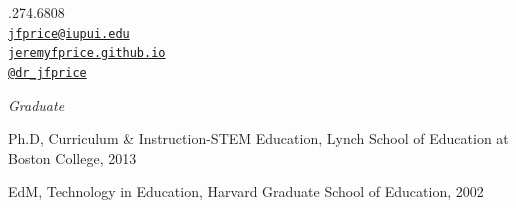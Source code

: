 \documentclass[11pt,article,oneside]{memoir}
\makeatletter
\def\myemail{jfprice@iupui.edu}
\def\myweb{jeremyfprice.github.io}
\def\myphone{1.317.274.6808}
\def\mytwitter{@dr\_jfprice}
\makeatother
\begin{document}


\begin{minipage}[t]{2.95in}
  
\end{minipage}
\hfill     
\hfill
\begin{minipage}[t]{1.3in}
  \flushright \footnotesize  \addressblock \myphone \, \faPhone \\ 
  {\scriptsize  \texttt{\href{mailto:\myemail}{\myemail}} \, \faEnvelope} \\
  {\scriptsize  \texttt{\href{\myweb}{\myweb}} \, \faGlobe} \\
  {\scriptsize  \texttt{\href{http://twitter.com/dr_jfprice}{\mytwitter}} \, \faTwitter } 
\end{minipage}

\medskip

\reversemarginpar

\bigskip



\noindent\emph{Graduate \vspace{0.01in}}

\ind Ph.D, Curriculum \& Instruction-STEM Education, Lynch School of Education at Boston College, 2013


\ind EdM, Technology in Education, Harvard Graduate School of Education, 2002
\end{document}
